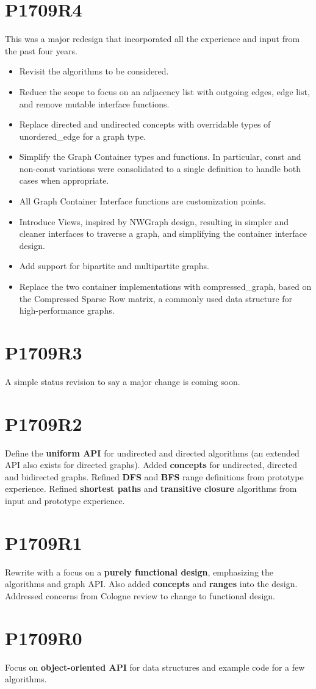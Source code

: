 \section*{P1709R4}
This was a major redesign that incorporated all the experience and input from the past four years.
\begin{itemize}
\item Revisit the algorithms to be considered.
\item Reduce the scope to focus on an adjacency list with outgoing edges, edge list, and remove mutable interface functions. 
\item Replace directed and undirected concepts with overridable types of unordered\_edge for a graph type.
\item Simplify the Graph Container types and functions. In particular, const and non-const variations were consolidated to a single definition to handle both cases 
when appropriate.
\item All Graph Container Interface functions are customization points.
\item Introduce Views, inspired by NWGraph design, resulting in simpler and cleaner interfaces to traverse a graph, and simplifying the container interface design.
\item Add support for bipartite and multipartite graphs.
\item Replace the two container implementations with compressed\_graph, based on the Compressed Sparse Row matrix, a commonly used 
      data structure for high-performance graphs.
\end{itemize}

\section*{P1709R3}
A simple status revision to say a major change is coming soon.

\section*{P1709R2}
Define the \textbf{uniform API} for undirected and directed algorithms (an extended API also exists for directed graphs). Added \textbf{concepts} for undirected, directed and bidirected graphs. Refined \textbf{DFS} and \textbf{BFS} range definitions from prototype experience. Refined \textbf{shortest paths} and \textbf{transitive closure} algorithms from input and prototype experience.

\section*{P1709R1}
Rewrite with a focus on a \textbf{purely functional design}, emphasizing the algorithms and graph API. Also added \textbf{concepts} and \textbf{ranges} into the design. Addressed concerns from Cologne review to change to functional design.

\section*{P1709R0}
Focus on \textbf{object-oriented API} for data structures and example code for a few algorithms.
